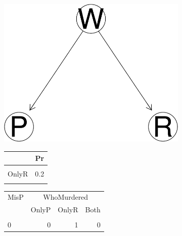 \documentclass[
  10pt,
]{scrartcl}
\begin{document}
\begin{figure}[H]
\begin{subfigure}[!ht]{0.4\textwidth}

\begin{center}\includegraphics{coherencePaper40_files/figure-latex/robbersDAGplot-1} \end{center}
\end{subfigure} \hfill
\begin{subfigure}[!ht]{0.4\textwidth}

\centering\begingroup\fontsize{9}{11}\selectfont
\begin{tabular}{lr}
\toprule
  & Pr\\
\midrule
\cellcolor{gray!6}{OnlyP} & \cellcolor{gray!6}{0.2}\\
OnlyR & 0.2\\
\cellcolor{gray!6}{Both} & \cellcolor{gray!6}{0.6}\\
\bottomrule
\end{tabular}




\begin{tabular}{lrrr}
\toprule
\multicolumn{1}{c}{MisP} & \multicolumn{3}{c}{WhoMurdered} \\
  & OnlyP & OnlyR & Both\\
\midrule
\cellcolor{gray!6}{1} & \cellcolor{gray!6}{1} & \cellcolor{gray!6}{0} & \cellcolor{gray!6}{1}\\
0 & 0 & 1 & 0\\
\bottomrule
\end{tabular}


\end{subfigure}
\end{figure}
\end{document}
